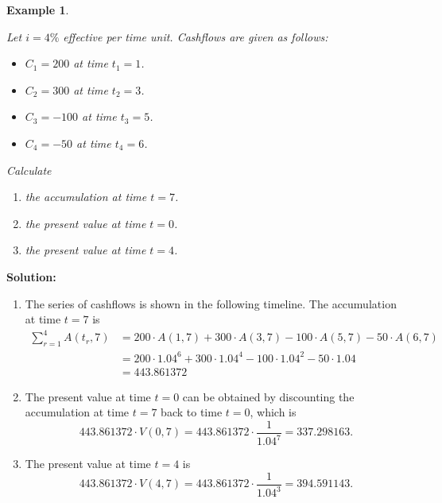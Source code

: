 \documentclass[landscape, 20pt]{extreport}
\theoremstyle{definition}
\theoremstyle{definition}
\newtheorem{example}{Example}[chapter]
\theoremstyle{definition}
\theoremstyle{definition}
\theoremstyle{remark}
\begin{document}
\newpage \begin{example}
\protect\hypertarget{exm:unlabeled-div-17}{}\label{exm:unlabeled-div-17}

\emph{Let \(i = 4\%\) effective per time unit. Cashflows are
given as follows:}

\begin{itemize}
\item
  \emph{\(C_1 = 200\) at time \(t_1 = 1\).}
\item
  \emph{\(C_2 = 300\) at time \(t_2 = 3\).}
\item
  \emph{\(C_3 = -100\) at time \(t_3 = 5\).}
\item
  \emph{\(C_4 = -50\) at time \(t_4 = 6\).}
\end{itemize}

\emph{Calculate}

\begin{enumerate}
\def\labelenumi{\arabic{enumi}.}
\item
  \emph{the accumulation at time \(t = 7\).}
\item
  \emph{the present value at time \(t = 0\).}
\item
  \emph{the present value at time \(t = 4\).}
\end{enumerate}

\end{example}

\textbf{Solution:}

\begin{enumerate}
\def\labelenumi{\arabic{enumi}.}
\item
  The series of cashflows is shown in the following timeline. The
  accumulation at time \(t = 7\) is \[\begin{aligned}
      \sum_{r=1}^4 A(t_r,7) &= 200 \cdot A(1,7) +  300 \cdot A(3,7) -  100 \cdot A(5,7) -  50 \cdot A(6,7) \\
      &= 200 \cdot 1.04^6 + 300 \cdot 1.04^4 - 100 \cdot 1.04^2 - 50 \cdot 1.04 \\
      & = 443.861372\end{aligned}\]
\item
  The present value at time \(t = 0\) can be obtained by discounting the
  accumulation at time \(t = 7\) back to time \(t = 0\), which is
  \[443.861372  \cdot V(0,7) = 443.861372  \cdot \frac{1}{1.04^7} = 337.298163.\]
\item
  The present value at time \(t = 4\) is
  \[443.861372  \cdot V(4,7) = 443.861372  \cdot \frac{1}{1.04^3} = 394.591143.\]
\end{enumerate}
\end{document}
